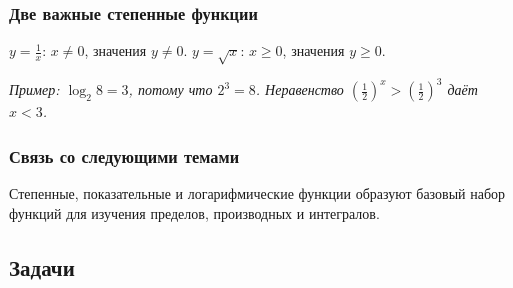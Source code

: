 \documentclass[12pt,a4paper]{article}
\theoremstyle{definition}
\theoremstyle{plain}
\theoremstyle{remark}
\begin{document}
\subsubsection*{Две важные степенные функции}
\(y = \frac{1}{x}\): \(x \ne 0\), значения \(y \ne  0\). \(y = \sqrt{x}\): \(x \ge 0\), значения \(y \ge  0\).\par
{\small\textit{Пример: \(\log _{2} 8 = 3\), потому что \(2^{3} = 8\). Неравенство \((\frac{1}{2})^{x} > (\frac{1}{2})^{3}\) даёт \(x < 3\).}}\par
\subsubsection*{Связь со следующими темами}
Степенные, показательные и логарифмические функции образуют базовый набор функций для изучения пределов, производных и интегралов.
\subsection*{Задачи}
\end{document}
